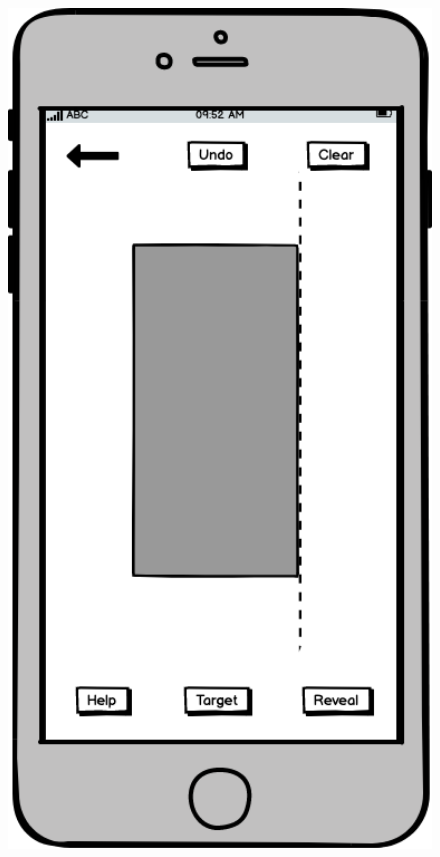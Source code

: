 \documentclass[11pt]{article}
\begin{document}
\begin{figure}
\begin{minipage}[c]{0.35\textwidth}
                \includegraphics[width=1\textwidth]{Images/Prototype/prototypeMatchPatternCreate.png}
                \end{minipage}
            \end{figure}
\end{document}
